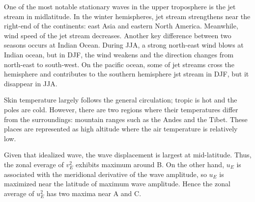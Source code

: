 \documentclass[11pt,a4paper]{article}
\begin{document}



\begin{solution}
One of the most notable stationary waves in the upper troposphere is the jet stream in midlatitude. In the winter hemispheres, jet stream strengthens near the right-end of the continents: east Asia and eastern North America. Meanwhile, wind speed of the jet stream decreases. Another key difference between two seasons occurs at Indian Ocean. During JJA, a strong north-east wind blows at Indian ocean, but in DJF, the wind weakens and the direction changes from north-east to south-west. On the pacific ocean, some of jet streams cross the hemisphere and contributes to the southern hemisphere jst stream in DJF, but it disappear in JJA.
\end{solution}

\begin{solution}
    Skin temperature largely follows the general circulation; tropic is hot and the poles are cold. However, there are two regions where their temperatures differ from the surroundings: mountain ranges such as the Andes and the Tibet. These places are represented as high altitude where the air temperature is relatively low. 
\end{solution}

\begin{solution}
Given that idealized wave, the wave displacement is largest at mid-latitude. Thus, the zonal everage of $v_E^2$ exhibits maximum around B. On the other hand, $u_E$ is associated with the meridional derivative of the wave amplitude, so $u_E$ is maximized near the latitude of maximum wave amplitude. Hence the zonal average of $u_E^2$ has two maxima near A and C.
\end{solution}
\end{document}
